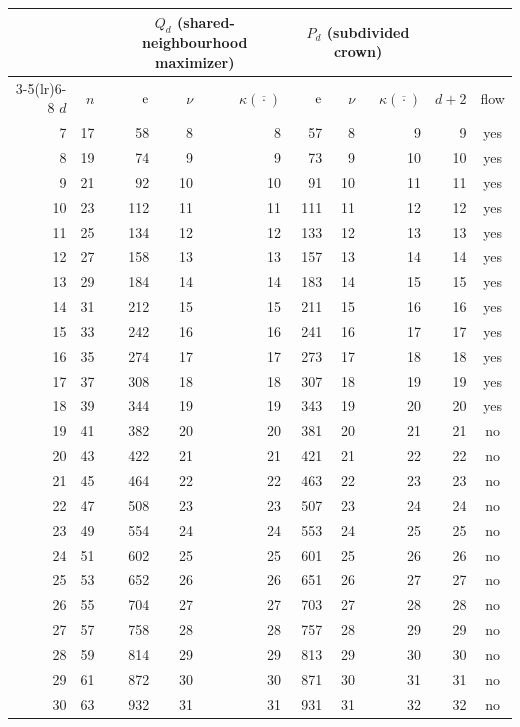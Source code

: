 \begin{tabular}{rrrrrrrrrc}
\toprule
 & & \multicolumn{3}{c}{$Q_d$ (shared-neighbourhood maximizer)} & \multicolumn{3}{c}{$P_d$ (subdivided crown)} & & \\
\cmidrule(lr){3-5}\cmidrule(lr){6-8}
$d$ & $n$ & $\mathrm{e}$ & $\nu$ & $\kappa(\overline{\cdot})$ & $\mathrm{e}$ & $\nu$ & $\kappa(\overline{\cdot})$ & $d+2$ & flow \\
\midrule
7 & 17 & 58 & 8 & 8 & 57 & 8 & 9 & 9 & yes \\
8 & 19 & 74 & 9 & 9 & 73 & 9 & 10 & 10 & yes \\
9 & 21 & 92 & 10 & 10 & 91 & 10 & 11 & 11 & yes \\
10 & 23 & 112 & 11 & 11 & 111 & 11 & 12 & 12 & yes \\
11 & 25 & 134 & 12 & 12 & 133 & 12 & 13 & 13 & yes \\
12 & 27 & 158 & 13 & 13 & 157 & 13 & 14 & 14 & yes \\
13 & 29 & 184 & 14 & 14 & 183 & 14 & 15 & 15 & yes \\
14 & 31 & 212 & 15 & 15 & 211 & 15 & 16 & 16 & yes \\
15 & 33 & 242 & 16 & 16 & 241 & 16 & 17 & 17 & yes \\
16 & 35 & 274 & 17 & 17 & 273 & 17 & 18 & 18 & yes \\
17 & 37 & 308 & 18 & 18 & 307 & 18 & 19 & 19 & yes \\
18 & 39 & 344 & 19 & 19 & 343 & 19 & 20 & 20 & yes \\
19 & 41 & 382 & 20 & 20 & 381 & 20 & 21 & 21 & no \\
20 & 43 & 422 & 21 & 21 & 421 & 21 & 22 & 22 & no \\
21 & 45 & 464 & 22 & 22 & 463 & 22 & 23 & 23 & no \\
22 & 47 & 508 & 23 & 23 & 507 & 23 & 24 & 24 & no \\
23 & 49 & 554 & 24 & 24 & 553 & 24 & 25 & 25 & no \\
24 & 51 & 602 & 25 & 25 & 601 & 25 & 26 & 26 & no \\
25 & 53 & 652 & 26 & 26 & 651 & 26 & 27 & 27 & no \\
26 & 55 & 704 & 27 & 27 & 703 & 27 & 28 & 28 & no \\
27 & 57 & 758 & 28 & 28 & 757 & 28 & 29 & 29 & no \\
28 & 59 & 814 & 29 & 29 & 813 & 29 & 30 & 30 & no \\
29 & 61 & 872 & 30 & 30 & 871 & 30 & 31 & 31 & no \\
30 & 63 & 932 & 31 & 31 & 931 & 31 & 32 & 32 & no \\
\bottomrule
\end{tabular}
